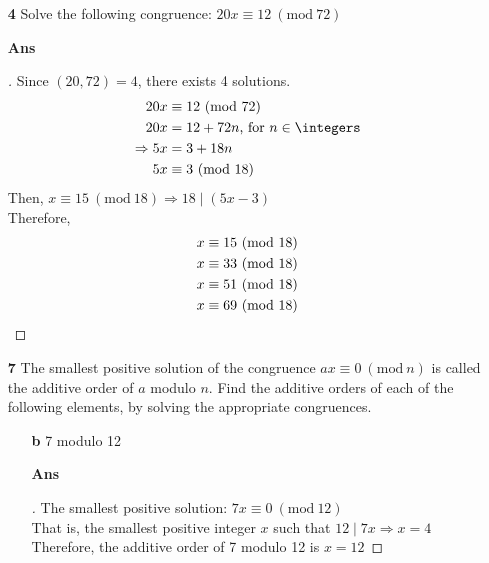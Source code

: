 \documentclass[paper=usletter, fontsize=12pt]{article}
\newcommand{\Mod}[1]{\ (\mathrm{mod}\ #1)}
\begin{document}
\begin{itemize}
\begin{itemize}
            \item[\textbf{4}] Solve the following congruence: $20x \equiv 12
            \Mod{72}$
            \item[\textbf{Ans}]
            \begin{proof}[\unskip\nopunct]
                Since $(20,72)=4$, there exists 4 solutions.
                \begin{align*}
                    20x & \equiv 12 \Mod{72} \\
                    20x & = 12 + 72n \text{, for } n \in \integers\\
                    \Rightarrow 5x & = 3 + 18n\\
                    5x & \equiv 3 \Mod{18}
                \end{align*}
                Then, $x \equiv 15 \Mod{18} \Rightarrow 18 \mid (5x-3)$\\
                Therefore,
                \begin{align*}
                    x & \equiv 15 \Mod{18}\\
                    x & \equiv 33 \Mod{18}\\
                    x & \equiv 51 \Mod{18}\\
                    x & \equiv 69 \Mod{18} \qedhere
                \end{align*}
            \end{proof}
            \vspace{0.2in}

            \item[\textbf{7}] The smallest positive solution of the congruence
            $ax \equiv 0 \Mod{n}$ is called the additive order of
            $a$ modulo $n$. Find the additive orders of each of the following
            elements, by solving the appropriate congruences.

            \begin{itemize}

                \item[\textbf{b}] 7 modulo 12
                \item[\textbf{Ans}]
                \begin{proof}[\unskip\nopunct]
                    The smallest positive solution: $7x \equiv 0 \Mod{12}$\\
                    That is, the smallest positive integer $x$ such that $12
                    \mid 7x \Rightarrow x=4$\\ Therefore, the additive order of
                    7 modulo 12 is $x = 12$ \qedhere
                \end{proof}
                \vspace{0.2in}


\end{itemize}
\end{itemize}
\end{itemize}
\end{document}

